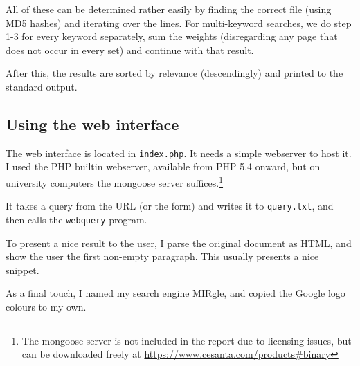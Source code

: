 \documentclass[12pt,a4paper]{article}
\begin{document}
All of these can be determined rather easily by finding the correct file (using MD5 hashes) and iterating over the lines. For multi-keyword searches, we do step 1-3 for every keyword separately, sum the weights (disregarding any page that does not occur in every set) and continue with that result.

After this, the results are sorted by relevance (descendingly) and printed to the standard output.

\subsection{Using the web interface}

The web interface is located in \texttt{index.php}. It needs a simple webserver to host it. I used the PHP builtin webserver, available from PHP 5.4 onward, but on university computers the mongoose server suffices.\footnote{The mongoose server is not included in the report due to licensing issues, but can be downloaded freely at \url{https://www.cesanta.com/products\#binary}}

It takes a query from the URL (or the form) and writes it to \texttt{query.txt}, and then calls the \texttt{webquery} program.

To present a nice result to the user, I parse the original document as HTML, and show the user the first non-empty paragraph. This usually presents a nice snippet.

As a final touch, I named my search engine MIRgle, and copied the Google logo colours to my own.
\end{document}
